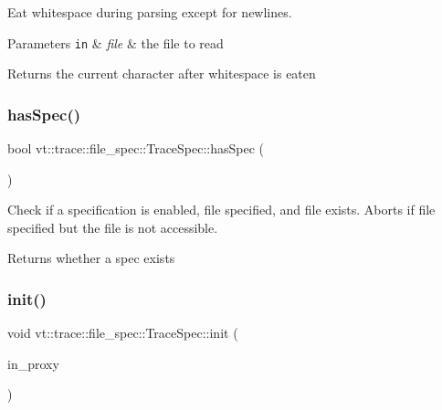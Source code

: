 Eat whitespace during parsing except for newlines. 


\begin{DoxyParams}[1]{Parameters}
\mbox{\tt in}  & {\em file} & the file to read\\
\hline
\end{DoxyParams}
\begin{DoxyReturn}{Returns}
the current character after whitespace is eaten 
\end{DoxyReturn}
\mbox{\label{structvt_1_1trace_1_1file__spec_1_1_trace_spec_ad83e3bc71e3ebcd794fc38e7c2b7a74c}} 
\subsubsection{\texorpdfstring{has\+Spec()}{hasSpec()}}
{\footnotesize\ttfamily bool vt\+::trace\+::file\+\_\+spec\+::\+Trace\+Spec\+::has\+Spec (\begin{DoxyParamCaption}{ }\end{DoxyParamCaption})}



Check if a specification is enabled, file specified, and file exists. Aborts if file specified but the file is not accessible. 

\begin{DoxyReturn}{Returns}
whether a spec exists 
\end{DoxyReturn}
\mbox{\label{structvt_1_1trace_1_1file__spec_1_1_trace_spec_aa919658e5981872e86e4aa2ed1186f46}} 
\subsubsection{\texorpdfstring{init()}{init()}}
{\footnotesize\ttfamily void vt\+::trace\+::file\+\_\+spec\+::\+Trace\+Spec\+::init (\begin{DoxyParamCaption}\item[{\hyperlink{structvt_1_1trace_1_1file__spec_1_1_trace_spec_a26160cff9bb5115866943ed823405f1f}{Proxy\+Type}}]{in\+\_\+proxy }\end{DoxyParamCaption})\hspace{0.3cm}{\ttfamily [private]}}



